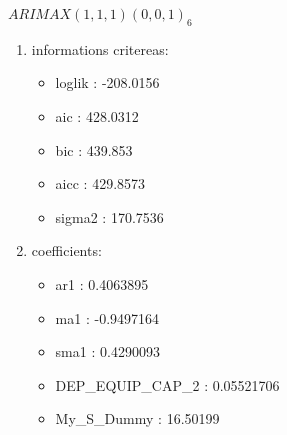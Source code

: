 \documentclass[10pt,a4paper]{article}\usepackage[]{graphicx}\usepackage[]{color}
\newcommand{\AaA}{\_}
\begin{document}
\begin{multicols}{2}
\columnbreak


 $ARIMAX(1,1,1)(0,0,1)_{6}$ 
\begin{enumerate}
\item informations critereas:
\begin{itemize}
\item  loglik :  -208.0156 
\item  aic :  428.0312 
\item  bic :  439.853 
\item  aicc :  429.8573 
\item  sigma2 :  170.7536 
\end{itemize}

\item coefficients:
\begin{itemize}
\item  ar1 :  0.4063895 
\item  ma1 :  -0.9497164 
\item  sma1 :  0.4290093 
\item  DEP\AaA EQUIP\AaA CAP\AaA 2 :  0.05521706 
\item  My_S_Dummy :  16.50199 
\end{itemize}
\end{enumerate}
\end{multicols}
\end{document}
